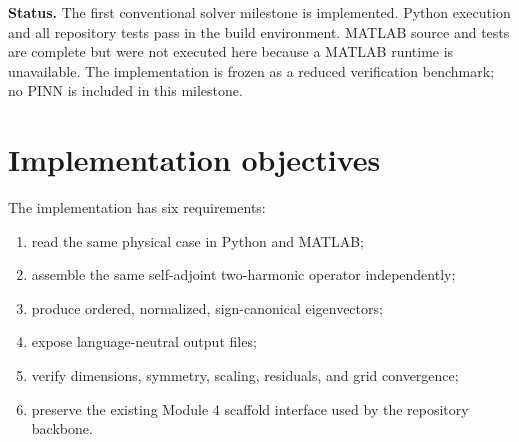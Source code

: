\documentclass[11pt]{article}
\begin{document}

\begin{overviewbox}
\textbf{Status.} The first conventional solver milestone is implemented. Python execution and all repository tests pass in the build environment. MATLAB source and tests are complete but were not executed here because a MATLAB runtime is unavailable. The implementation is frozen as a reduced verification benchmark; no PINN is included in this milestone.
\end{overviewbox}

\ProjectTOC

\section{Implementation objectives}
The implementation has six requirements:
\begin{enumerate}[leftmargin=1.6em]
\item read the same physical case in Python and MATLAB;
\item assemble the same self-adjoint two-harmonic operator independently;
\item produce ordered, normalized, sign-canonical eigenvectors;
\item expose language-neutral output files;
\item verify dimensions, symmetry, scaling, residuals, and grid convergence;
\item preserve the existing Module 4 scaffold interface used by the repository backbone.
\end{enumerate}
\end{document}

